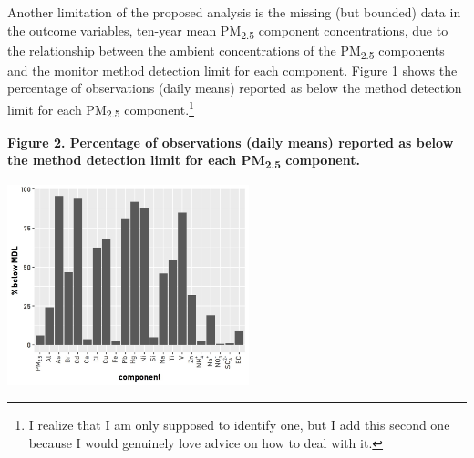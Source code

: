 \documentclass{article}\usepackage[]{graphicx}\usepackage[]{color}
\begin{document}
\begin{enumerate}[label=\textbf{\arabic*.}]
Another limitation of the proposed analysis is the missing (but bounded) data in the outcome variables, ten-year mean PM\textsubscript{2.5} component concentrations, due to the relationship between the ambient concentrations of the PM\textsubscript{2.5} components and the monitor method detection limit for each component. Figure 1 shows the percentage of observations (daily means) reported as below the method detection limit for each PM\textsubscript{2.5} component.\footnote{I realize that I am only supposed to identify one, but I add this second one because I would genuinely love advice on how to deal with it.}

  \textbf{Figure 2. Percentage of observations (daily means) reported as below the method detection limit for each PM\textsubscript{2.5} component.}

  \includegraphics[height=2.3in]{detectionlimit.jpg}

\end{enumerate}
      
\end{document}
